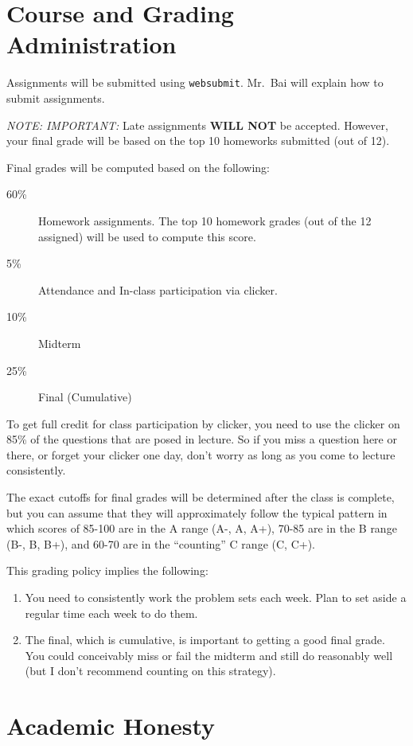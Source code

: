 \documentclass[11pt]{article}
\begin{document}
\section*{Course and Grading Administration}

Assignments will be submitted using \texttt{websubmit}.   Mr.\ Bai will
explain how to submit assignments.  

\emph{NOTE: IMPORTANT:} Late assignments \textbf{WILL NOT} be accepted.   However, your final
grade will be based on the top 10 homeworks submitted (out of 12).   

Final grades will be computed based on the following:
\begin{description}
\item[60\%] Homework assignments.  The top 10 homework grades (out of the
  12 assigned) will be used to compute this score.
\item[5\%] Attendance and In-class participation via clicker.
\item[10\%] Midterm
\item[25\%] Final (Cumulative)
\end{description}

To get full credit for class participation by clicker, you need to use
the clicker on 85\% of the questions that are posed in lecture.   So if
you miss a question here or there, or forget your clicker one day, don't
worry as long as you come to lecture consistently.

The exact cutoffs for final grades will be determined after the class is
complete, but you can assume that they will approximately follow the
typical pattern in which scores of 85-100 are in the A range (A-, A,
A+), 70-85 are in the B range (B-, B, B+), and 60-70 are in the
``counting'' C range (C, C+).

This grading policy implies the following:
\begin{enumerate}
\item You need to consistently work the problem sets each week.   Plan
  to set aside a regular time each week to do them.
\item The final, which is cumulative, is important to getting a good
  final grade.   You could conceivably miss or fail the midterm and
  still do reasonably well (but I don't recommend counting on this strategy).
\end{enumerate}

\newpage

\section*{Academic Honesty}
\end{document}
